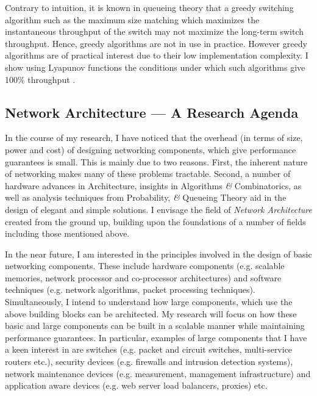 \documentclass[a4paper, 12pt]{article}
\begin{document}
\begin{small}
\begin{enumerate}

Contrary to intuition, it is known in queueing theory that a greedy
switching algorithm such as the maximum size matching which
maximizes the instantaneous throughput of the switch may not
maximize the long-term switch throughput. Hence, greedy algorithms
are not in use in practice.
However greedy algorithms are of practical interest due to their low implementation complexity.
I show using Lyapunov functions the conditions under which
such algorithms give 100\% throughput \cite{msm}.

\end{enumerate}


\subsection*{Network Architecture ---  A Research Agenda}

   In the course of my research, I have noticed that the overhead (in terms
of size, power and cost) of designing networking components, which give
performance guarantees is small.
This is mainly due to two reasons. First, the inherent nature of
networking makes many of these problems tractable. Second, a number of
hardware advances in Architecture, insights in Algorithms {\it \&} Combinatorics,
as well as analysis techniques from Probability, {\it \&} Queueing Theory
aid in the design of elegant and simple solutions.
I envisage the field of {\it Network Architecture} created from the
ground up, building upon the foundations of a number of fields
including those mentioned above.


In the near future, I am interested in the
principles involved in the design of basic networking
components. These include
hardware components (e.g. scalable memories,
network processor and co-processor architectures) and
software techniques (e.g. network algorithms, packet processing
techniques).
  Simultaneously, I intend to understand how large components, which use
the above building blocks can be architected.
My research will focus on how these basic and large
components can be built in a scalable manner while maintaining
performance guarantees.
In particular, examples of large components that I have a keen
interest in are switches
(e.g. packet and circuit switches, multi-service routers etc.),
security devices (e.g. firewalls and intrusion detection
systems), network maintenance devices (e.g. measurement,
management infrastructure) and application aware devices
(e.g. web server load balancers, proxies) etc.


\end{small}
\end{document}
